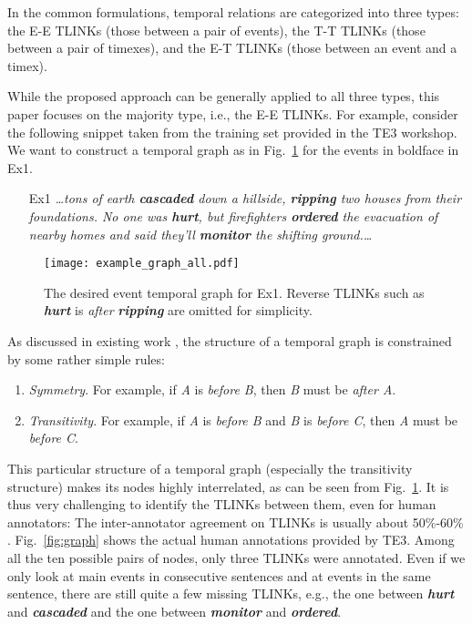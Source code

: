 \documentclass[11pt,letterpaper]{article}
\newcommand{\event}[1]{\textit{\textbf{#1}}}
\newcommand{\rel}[1]{\textit{#1}}
\newcommand{\ignore}[1]{}
\newcommand{\final}[1]{#1}
\begin{document}
\final{In the common formulations, temporal relations are categorized into three types: the E-E TLINKs (those between a pair of events), the T-T TLINKs (those between a pair of timexes), and the E-T TLINKs (those between an event and a timex).}
\ignore{\final{The} temporal relation task requires \final{the identification of}
three types of temporal relations, \final{those} between a pair of events (E-E TLINKs), \final{between} a pair of timexes (T-T TLINKs), or \final{between an event} and \final{a} timex (E-T TLINKs).}
\final{While the proposed approach can be generally applied to all three types, this paper focuses on the majority type, i.e., the E-E TLINKs.}
For example, \final{consider the following snippet taken from the training set provided in the TE3 workshop}. We \final{want} to construct a temporal graph as in Fig.~\ref{fig:graph all} for the events in boldface in Ex1.
\begin{enumerate}
	\item [Ex1] \textit{\dots tons of earth \textbf{cascaded} down a hillside, \textbf{ripping} two houses from their foundations. No one was \textbf{hurt}, but firefighters \textbf{ordered} the evacuation of nearby homes and said they'll \textbf{monitor} the shifting ground.\dots}
\end{enumerate}
\begin{figure}[htbp!]
	\centering
	\texttt{[image: example\_graph\_all.pdf]}
	\caption{\small The desired event temporal graph for Ex1. Reverse TLINKs such as \event{hurt} is \rel{after} \event{ripping} are omitted for simplicity.}
	\label{fig:graph all}
\end{figure}

As \final{discussed in} existing work \citep{verhagen2004times, BDLB06, mani2006machine, ChambersJu08}, the structure of a temporal graph is constrained by some rather simple rules:
\begin{enumerate}
	\item \textit{Symmetry}. For example, if \textit{A} is \textit{before B}, then \textit{B} must be \textit{after A}.
	\item \textit{Transitivity}. For example, if \textit{A} is \textit{before B} and \textit{B} is \textit{before C}, then \textit{A} must be \textit{before C}.
\end{enumerate}
This particular structure of a temporal graph (especially the transitivity structure) makes its nodes highly interrelated, as can be seen from Fig.~\ref{fig:graph all}. 
It is thus very challenging to identify the TLINKs between them, even for human annotators: The inter-annotator agreement on TLINKs is usually about 50\%-60\% \citep{mani2006machine}. Fig.~\ref{fig:graph} shows the actual human annotations provided by TE3. Among all the ten possible pairs of nodes, only three TLINKs \ignore{(i.e., \event{ripping} is \rel{before} \event{hurt}, \event{ripping} is \rel{included} in \event{cascaded}, and \event{cascaded} is \rel{before} \event{ordered})} were annotated.
Even if we only look at main events in consecutive sentences and at events in the same sentence, there are still quite a few missing TLINKs, e.g., the one between \event{hurt} and \event{cascaded} and the one between \event{monitor} and \event{ordered}.
\end{document}
